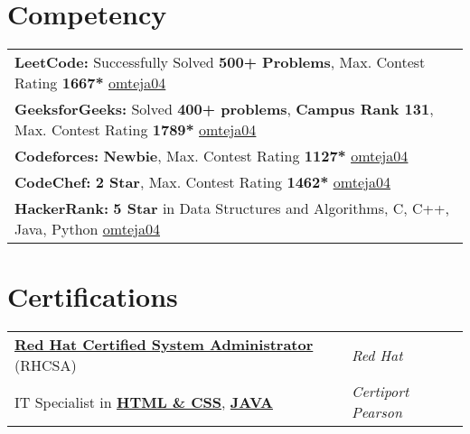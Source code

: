 \documentclass[a4paper,10pt]{article}
\begin{document}
\section{Competency}
\begin{tabularx}{\linewidth}{@{} X@{}}	
    \textbf{LeetCode:} Successfully Solved \textbf{500+ Problems}, Max. Contest Rating \textbf{1667*} \hfill \href{https://www.leetcode.com/omteja04}{\underline{omteja04}} \\
    \textbf{GeeksforGeeks:} Solved \textbf{400+ problems}, \textbf{Campus Rank 131}, Max. Contest Rating \textbf{1789*} \hfill \href{https://www.geeksforgeeks.org/user/omteja04/}{\underline{omteja04}} \\
    \textbf{Codeforces:} \textbf{Newbie}, Max. Contest  Rating \textbf{1127*}
    \hfill  \href{https://codeforces.com/profile/omteja04}{\underline{omteja04}} \\
    \textbf{CodeChef:} \textbf{2 Star}, Max. Contest Rating \textbf{1462*} \hfill \href{https://www.codechef.com/users/omteja04}{\underline{omteja04}} \\
    \textbf{HackerRank:} \textbf{5 Star} in Data Structures and Algorithms, C, C++, Java, Python \hfill \href{https://www.hackerrank.com/profile/omteja04}{\underline{omteja04}} \\
\end{tabularx}
\section{Certifications}
\begin{tabularx}{\linewidth}{@{} l X@{}}
    \href{https://rhtapps.redhat.com/verify?certId=240-110-783}{\textbf{Red Hat Certified System Administrator}} (RHCSA) & \textcolor{bullets}{\emph{Red Hat}} \\
    IT Specialist in \href{https://www.credly.com/badges/aea2b491-a0e3-4ed8-8e4b-2da4ec311639/public_url}{\textbf{HTML \& CSS}}, \href{https://www.credly.com/badges/17ee233e-54bd-4955-94a4-999a9468809f/public_url}{\textbf{JAVA}} &  \textcolor{bullets}{\emph{Certiport Pearson}}
\end{tabularx}
\vfill
\end{document}
